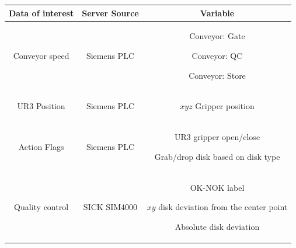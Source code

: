\documentclass[5p,times,procedia]{elsarticle}
\begin{document}
\begin{table}
       \centering
       \begin{adjustbox}{width=.45\textwidth}
       \begin{tabular}{ c c c } \toprule
              \textbf{Data of interest} & \textbf{Server Source} & \textbf{Variable}\\ \midrule
              Conveyor speed       & Siemens PLC       & \begin{minipage}[t]{0.2\textwidth}
              \begin{description}
                     \item Conveyor: Gate
                     \item Conveyor: QC
                     \item Conveyor: Store
                     \end{description}
                     \end{minipage} \\ \hline
              UR3 Position         & Siemens PLC       & \begin{minipage}[t]{0.2\textwidth}
              \begin{description}
                     \item $xyz$ Gripper position
                     \end{description}
                     \end{minipage} \\ \hline
              Action Flags         & Siemens PLC       & \begin{minipage}[t]{0.2\textwidth}
              \begin{description}
                     \item UR3 gripper open/close
                     \item Grab/drop disk based on disk type
                     \end{description}
                     \end{minipage} \\ \hline
              Quality control      & SICK SIM4000      & \begin{minipage}[t]{0.2\textwidth}
              \begin{description}
                     \item OK-NOK label
                     \item $xy$ disk deviation from the center point
                     \item Absolute disk deviation

\end{description}
\end{minipage}
\end{tabular}
\end{adjustbox}
\end{table}
\end{document}
